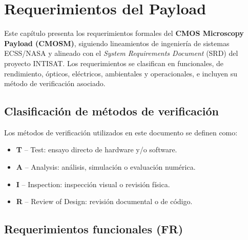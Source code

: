 \chapter{Requerimientos del Payload}
\label{ch:requerimientos}

Este capítulo presenta los requerimientos formales del
\textbf{CMOS Microscopy Payload (CMOSM)}, siguiendo lineamientos de ingeniería de
sistemas ECSS/NASA y alineado con el \textit{System Requirements Document} (SRD)
del proyecto INTISAT. Los requerimientos se clasifican en funcionales, de
rendimiento, ópticos, eléctricos, ambientales y operacionales, e incluyen su
método de verificación asociado.

\section{Clasificación de métodos de verificación}

Los métodos de verificación utilizados en este documento se definen como:

\begin{itemize}
    \item \textbf{T} -- Test: ensayo directo de hardware y/o software.
    \item \textbf{A} -- Analysis: análisis, simulación o evaluación numérica.
    \item \textbf{I} -- Inspection: inspección visual o revisión física.
    \item \textbf{R} -- Review of Design: revisión documental o de código.
\end{itemize}

\section{Requerimientos funcionales (FR)}

